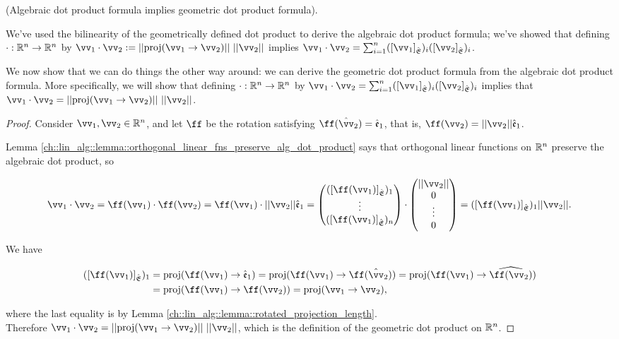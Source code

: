 \begin{theorem}
    (Algebraic dot product formula implies geometric dot product formula).
    
    We've used the bilinearity of the geometrically defined dot product to derive the algebraic dot product formula; we've showed that defining $\cdot:\mathbb{R}^n \rightarrow \mathbb{R}^n$ by ${\vv_1 \cdot \vv_2 := ||\proj(\vv_1 \rightarrow \vv_2)|| \spc ||\vv_2||}$ implies ${\vv_1 \cdot \vv_2 = \sum_{i = 1}^n ([\vv_1]_\sE)_i ([\vv_2]_\sE)_i}$.
    
    We now show that we can do things the other way around: we can derive the geometric dot product formula from the algebraic dot product formula. More specifically, we will show that defining $\cdot:\mathbb{R}^n \rightarrow \mathbb{R}^n$ by ${\vv_1 \cdot \vv_2 = \sum_{i = 1}^n ([\vv_1]_\sE)_i ([\vv_2]_\sE)_i}$ implies that ${\vv_1 \cdot \vv_2 = ||\proj(\vv_1 \rightarrow \vv_2)|| \spc ||\vv_2||}$.
\end{theorem}

\begin{proof}
    Consider $\vv_1, \vv_2 \in \R^n$, and let $\ff$ be the rotation satisfying $\ff(\hat{\vv}_2) = \see_1$, that is, $\ff(\vv_2) = ||\vv_2||\see_1$.
    
    Lemma \ref{ch::lin_alg::lemma::orthogonal_linear_fns_preserve_alg_dot_product} says that orthogonal linear functions on $\mathbb{R}^n$ preserve the algebraic dot product, so
    
    \begin{align*}
        \vv_1 \cdot \vv_2 
        = \ff(\vv_1) \cdot \ff(\vv_2) 
        = \ff(\vv_1) \cdot ||\vv_2|| \see_1 
        = \begin{pmatrix} ([\ff(\vv_1)]_\sE)_1 \\ \vdots \\ ([\ff(\vv_1)]_\sE)_n \end{pmatrix}
        \cdot 
        \begin{pmatrix} ||\vv_2|| \\ 0 \\ \vdots \\ 0 \end{pmatrix} 
        = 
        ([\ff(\vv_1)]_\sE)_1 ||\vv_2||.
    \end{align*}
    
    We have
    
    \begin{align*}
        ([\ff(\vv_1)]_\sE)_1
        &= \proj(\ff(\vv_1) \rightarrow \see_1) 
        = \proj(\ff(\vv_1) \rightarrow \ff(\hat{\vv}_2))
        = \proj(\ff(\vv_1) \rightarrow \widehat{\ff(\vv_2)}) \\
        &= \proj(\ff(\vv_1) \rightarrow \ff(\vv_2)) 
        = \proj(\vv_1 \rightarrow \vv_2),
    \end{align*}
    
    where the last equality is by Lemma \ref{ch::lin_alg::lemma::rotated_projection_length}. \\ Therefore $\vv_1 \cdot \vv_2 = ||\proj(\vv_1 \rightarrow \vv_2)|| \spc ||\vv_2||$, which is the definition of the geometric dot product on $\mathbb{R}^n$.
\end{proof}

